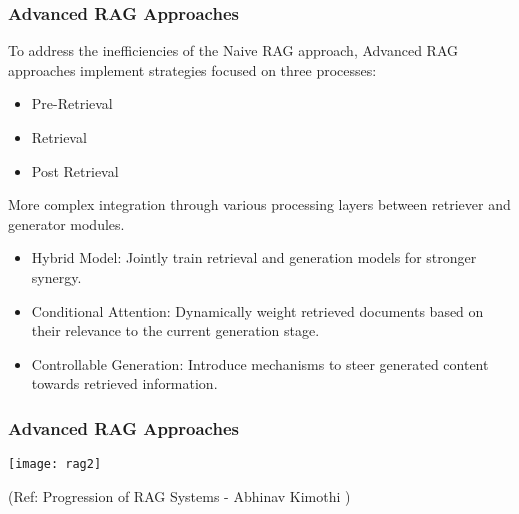 \begin{frame}[fragile]\frametitle{Advanced RAG Approaches}

To  address  the  inefficiencies  of  the  Naive  RAG  approach,  Advanced  RAG
approaches implement strategies focused on three processes:
\begin{itemize}
\item Pre-Retrieval
\item Retrieval
\item Post Retrieval
\end{itemize}	

More complex integration through various processing layers between retriever and generator modules.

\begin{itemize}
\item Hybrid Model: Jointly train retrieval and generation models for stronger synergy.
\item Conditional Attention: Dynamically weight retrieved documents based on their relevance to the current generation stage.
\item Controllable Generation: Introduce mechanisms to steer generated content towards retrieved information.
\end{itemize}	

\end{frame}

\begin{frame}[fragile]\frametitle{Advanced RAG Approaches}

\begin{center}
\texttt{[image: rag2]}

{\tiny (Ref: Progression of RAG Systems - Abhinav Kimothi )}
\end{center}	
\end{frame}


